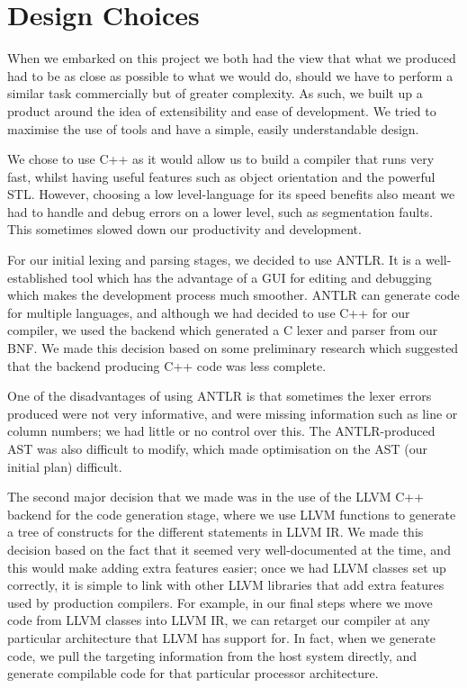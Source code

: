 \documentclass[a4wide, 11pt]{article}
\begin{document}
\section{Design Choices}

When we embarked on this project we both had the view that what we produced had to be as close as possible to what we would do, should we have to perform a similar task commercially but of greater complexity. As such, we built up a product around the idea of extensibility and ease of development. We tried to maximise the use of tools and have a simple, easily understandable design.

We chose to use C++ as it would allow us to build a compiler that runs very fast, whilst having useful features such as object orientation and the powerful STL. However, choosing a low level-language for its speed benefits also meant we had to handle and debug errors on a lower level, such as segmentation faults. This sometimes slowed down our productivity and development.

For our initial lexing and parsing stages, we decided to use ANTLR. It is a well-established tool which has the advantage of a GUI for editing and debugging which makes the development process much smoother. ANTLR can generate code for multiple languages, and although we had decided to use C++ for our compiler, we used the backend which generated a C lexer and parser from our BNF. We made this decision based on some preliminary research which suggested that the backend producing C++ code was less complete. 

One of the disadvantages of using ANTLR is that sometimes the lexer errors produced were not very informative, and were missing information such as line or column numbers; we had little or no control over this. The ANTLR-produced AST was also difficult to modify, which made optimisation on the AST (our initial plan) difficult.

The second major decision that we made was in the use of the LLVM C++ backend for the code generation stage, where we use LLVM functions to generate a tree of constructs for the different statements in LLVM IR. We made this decision based on the fact that it seemed very well-documented at the time, and this would make adding extra features easier; once we had LLVM classes set up correctly, it is simple to link with other LLVM libraries that add extra features used by production compilers. For example, in our final steps where we move code from LLVM classes into LLVM IR, we can retarget our compiler at any particular architecture that LLVM has support for. In fact, when we generate code, we pull the targeting information from the host system directly, and generate compilable code for that particular processor architecture.
\end{document}
